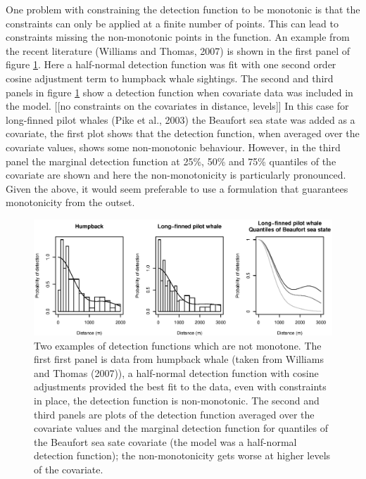 \documentclass[useAMS,referee, usegraphicx]{biom}
\begin{document}
One problem with constraining the detection function to be monotonic is that the constraints can only be applied at a finite number of points. This can lead to constraints missing the non-monotonic points in the function. An example from the recent literature (Williams and Thomas, 2007) is shown in the first panel of figure \ref{fig1}. Here a half-normal detection function was fit with one second order cosine adjustment term to humpback whale sightings. The second and third panels in figure \ref{fig1} show a detection function when covariate data was included in the model. [[no constraints on the covariates in distance, levels]] In this case for long-finned pilot whales (Pike et al., 2003) the Beaufort sea state was added as a covariate, the first plot shows that the detection function, when averaged over the covariate values, shows some non-monotonic behaviour. However, in the third panel the marginal detection function at 25\%, 50\% and 75\% quantiles of the covariate are shown and here the non-monotonicity is particularly pronounced. Given the above, it would seem preferable to use a formulation that guarantees monotonicity from the outset.

\begin{figure}
\centering
\includegraphics[width=\textwidth]{figs/figure1.eps}
\caption{Two examples of detection functions which are not monotone. The first first panel is data from humpback whale (taken from Williams and Thomas (2007)), a half-normal detection function with cosine adjustments provided the best fit to the data, even with constraints in place, the detection function is non-monotonic. The second and third panels are plots of the detection function averaged over the covariate values and the marginal detection function for quantiles of the Beaufort sea sate covariate (the model was a half-normal detection function); the non-monotonicity gets worse at higher levels of the covariate.}
\label{fig1}
\end{figure}
\end{document}
